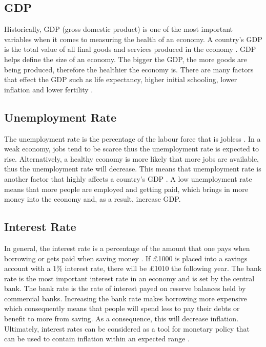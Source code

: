 \documentclass{UoYCSproject}
\begin{document}
\subsection{GDP}
Historically, GDP (gross domestic product) is one of the most important variables when it comes to measuring the health of an economy. A country's GDP is the total value of all final goods and services produced in the economy \cite{2003economics}. GDP helps define the size of an economy. The bigger the GDP, the more goods are being produced, therefore the healthier the economy is.  There are many factors that effect the GDP such as life expectancy, higher initial schooling, lower inflation and lower fertility \cite{barro1996determinants}. 

\subsection{Unemployment Rate}

The unemployment rate is the percentage of the labour force that is jobless \cite{unemployment}. In a weak economy, jobs tend to be scarce thus the unemployment rate is expected to rise. Alternatively, a healthy economy is more likely that more jobs are available, thus the unemployment rate will decrease. This means that unemployment rate is another factor that highly affects a country's GDP \cite{bean1993unemployment}. A low unemployment rate means that more people are employed and getting paid, which brings in more money into the economy and, as a result, increase GDP.  

\subsection{Interest Rate}
In general, the interest rate is a percentage of the amount that one pays when borrowing or gets paid when saving money \cite{interestrate}. If \pounds 1000 is placed into a savings account with a 1\% interest rate, there will be \pounds 1010 the following year.  The bank rate is the most important interest rate in an economy and is set by the central bank. The bank rate is the rate of interest payed on reserve balances held by commercial banks. Increasing the bank rate makes borrowing more expensive which consequently means that people will spend less to pay their debts or benefit to more from saving. As a consequence, this will decrease inflation. Ultimately, interest rates can be considered as a tool for monetary policy that can be used to contain inflation within an expected range \cite{christiano1999monetary}.  



\printbibliography
\end{document}
